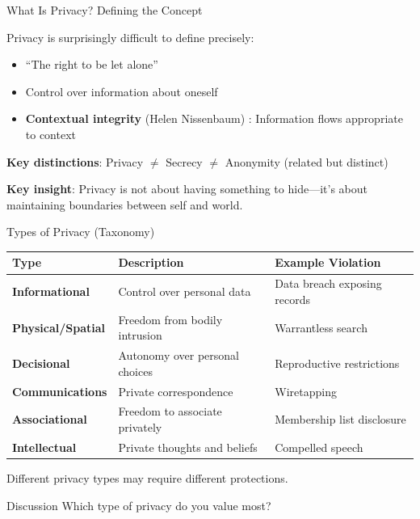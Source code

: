 ﻿\documentclass[aspectratio=169,11pt]{beamer}
\begin{document}
\begin{frame}{What Is Privacy? Defining the Concept}
\begin{conceptbox}
\small
Privacy is surprisingly difficult to define precisely:
\begin{itemize}
    \item ``The right to be let alone'' \parencite{warren_brandeis_privacy}
    \item Control over information about oneself
    \item \textbf{Contextual integrity} (Helen Nissenbaum) \parencite{nissenbaum_privacy_context}: Information flows appropriate to context
\end{itemize}
\end{conceptbox}

\vspace{0.3em}
\textbf{Key distinctions}: Privacy $\neq$ Secrecy $\neq$ Anonymity (related but distinct)

\textbf{Key insight}: Privacy is not about having something to hide---it's about maintaining boundaries between self and world.
\end{frame}

\begin{frame}{Types of Privacy (Taxonomy)}
\begin{table}[h]
\centering
\scriptsize
\begin{tabular}{@{}llp{4cm}@{}}
\toprule
\textbf{Type} & \textbf{Description} & \textbf{Example Violation} \\
\midrule
\textbf{Informational} & Control over personal data & Data breach exposing records \\
\textbf{Physical/Spatial} & Freedom from bodily intrusion & Warrantless search \\
\textbf{Decisional} & Autonomy over personal choices & Reproductive restrictions \\
\textbf{Communications} & Private correspondence & Wiretapping \\
\textbf{Associational} & Freedom to associate privately & Membership list disclosure \\
\textbf{Intellectual} & Private thoughts and beliefs & Compelled speech \\
\bottomrule
\end{tabular}
\end{table}

\vspace{0.2em}
Different privacy types may require different protections.

\begin{alertblock}{Discussion}
Which type of privacy do you value most?
\end{alertblock}
\end{frame}
\end{document}
